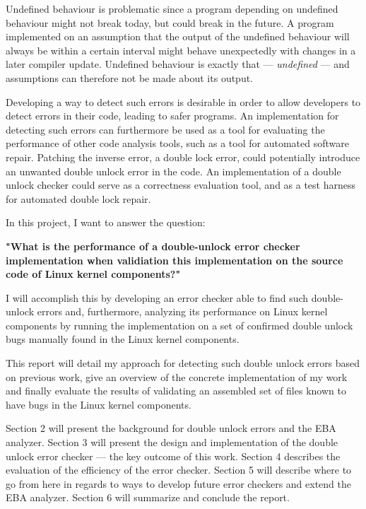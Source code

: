 \newpar Undefined behaviour is problematic since a program depending on undefined behaviour might not break today, but could break in the future. A program implemented on an assumption that the output of the undefined behaviour will always be within a certain interval might behave unexpectedly with changes in a later compiler update. Undefined behaviour is exactly that --- \textit{undefined} --- and assumptions can therefore not be made about its output.

\newpar Developing a way to detect such errors is desirable in order to allow developers to detect errors in their code, leading to safer programs. An implementation for detecting such errors can furthermore be used as a tool for evaluating the performance of other code analysis tools, such as a tool for automated software repair. Patching the inverse error, a double lock error, could potentially introduce an unwanted double unlock error in the code. An implementation of a double unlock checker could serve as a correctness evaluation tool, and as a test harness for automated double lock repair.

\newpar In this project, I want to answer the question:

\begin{center}
    \textbf{"What is the performance of a double-unlock error checker implementation when validiation this implementation on the source code of Linux kernel components?"} 
\end{center}

\newpar I will accomplish this by developing an error checker able to find such double-unlock errors and, furthermore, analyzing its performance on Linux kernel components by running the implementation on a set of confirmed double unlock bugs manually found in the Linux kernel components.

\newpar This report will detail my approach for detecting such double unlock errors based on previous work, give an overview of the concrete implementation of my work and finally evaluate the results of validating an assembled set of files known to have bugs in the Linux kernel components.

\newpar Section 2 will present the background for double unlock errors and the EBA analyzer. Section  3 will present the design and implementation of the double unlock error checker --- the key outcome of this work. Section 4 describes the evaluation of the efficiency of the error checker. Section 5 will describe where to go from here in regards to ways to develop future error checkers and extend the EBA analyzer. Section 6 will summarize and conclude the report.